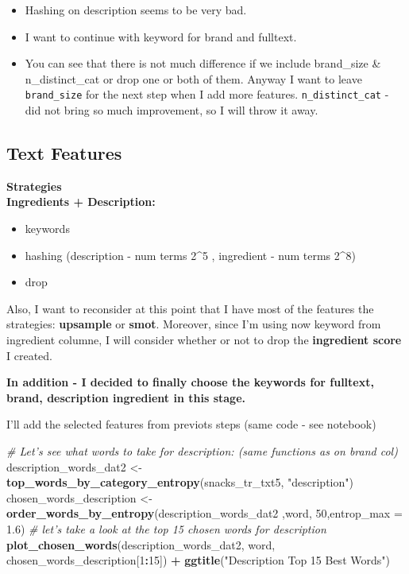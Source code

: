 \documentclass[
]{article}
\newenvironment{Shaded}{\begin{snugshade}}{\end{snugshade}}
\newcommand{\CommentTok}[1]{\textcolor[rgb]{0.56,0.35,0.01}{\textit{#1}}}
\newcommand{\DataTypeTok}[1]{\textcolor[rgb]{0.13,0.29,0.53}{#1}}
\newcommand{\DecValTok}[1]{\textcolor[rgb]{0.00,0.00,0.81}{#1}}
\newcommand{\FloatTok}[1]{\textcolor[rgb]{0.00,0.00,0.81}{#1}}
\newcommand{\KeywordTok}[1]{\textcolor[rgb]{0.13,0.29,0.53}{\textbf{#1}}}
\newcommand{\NormalTok}[1]{#1}
\newcommand{\OperatorTok}[1]{\textcolor[rgb]{0.81,0.36,0.00}{\textbf{#1}}}
\newcommand{\StringTok}[1]{\textcolor[rgb]{0.31,0.60,0.02}{#1}}
\providecommand{\tightlist}{%
  \setlength{\itemsep}{0pt}\setlength{\parskip}{0pt}}
\begin{document}
\begin{itemize}
\tightlist
\item
  Hashing on description seems to be very bad.
\item
  I want to continue with keyword for brand and fulltext.
\item
  You can see that there is not much difference if we include
  brand\_size \& n\_distinct\_cat or drop one or both of them. Anyway I
  want to leave \texttt{brand\_size} for the next step when I add more
  features. \texttt{n\_distinct\_cat} - did not bring so much
  improvement, so I will throw it away.
\end{itemize}

\hypertarget{text-features}{%
\subsection{Text Features}\label{text-features}}

\textbf{Strategies}\\
\textbf{Ingredients + Description:}

\begin{itemize}
\tightlist
\item
  keywords
\item
  hashing (description - num terms 2\^{}5 , ingredient - num terms
  2\^{}8)
\item
  drop
\end{itemize}

Also, I want to reconsider at this point that I have most of the
features the strategies: \textbf{upsample} or \textbf{smot}. Moreover,
since I'm using now keyword from ingredient columne, I will consider
whether or not to drop the \textbf{ingredient score} I created.

\textbf{In addition - I decided to finally choose the keywords for
fulltext, brand, description ingredient in this stage.}

I'll add the selected features from previots steps (same code - see
notebook)

\begin{Shaded}
\begin{Highlighting}[]
\CommentTok{# Let's see what words to take for description:  (same functions as on brand col)}
\NormalTok{description_words_dat2 <-}\StringTok{ }\KeywordTok{top_words_by_category_entropy}\NormalTok{(snacks_tr_txt5, }\StringTok{"description"}\NormalTok{)}
\NormalTok{chosen_words_description <-}\StringTok{ }\KeywordTok{order_words_by_entropy}\NormalTok{(description_words_dat2 ,word, }\DecValTok{50}\NormalTok{,}\DataTypeTok{entrop_max =}  \FloatTok{1.6}\NormalTok{)}
\CommentTok{# let's take a look at the top 15 chosen words for description}
\KeywordTok{plot_chosen_words}\NormalTok{(description_words_dat2, word, chosen_words_description[}\DecValTok{1}\OperatorTok{:}\DecValTok{15}\NormalTok{]) }\OperatorTok{+}\StringTok{ }\KeywordTok{ggtitle}\NormalTok{(}\StringTok{"Description Top 15 Best Words"}\NormalTok{)}
\end{Highlighting}
\end{Shaded}
\end{document}
